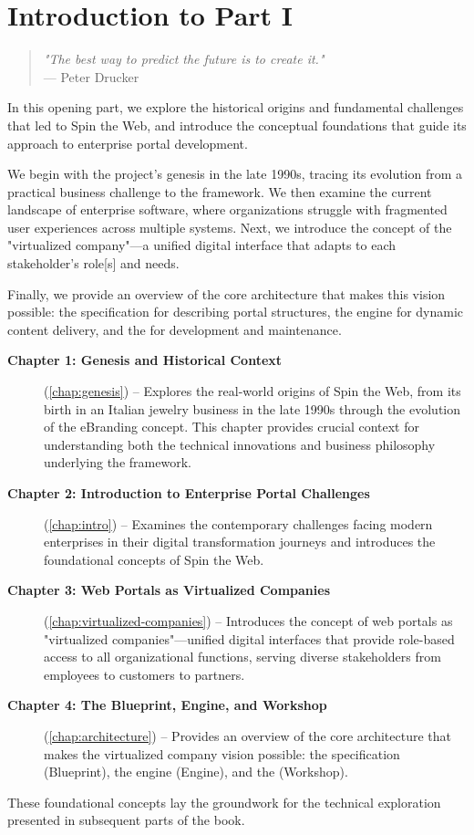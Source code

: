 
\chapter*{Introduction to Part I}
\label{part:foundations}

\begin{quote}
\textit{"The best way to predict the future is to create it."} \\
— Peter Drucker
\end{quote}

In this opening part, we explore the historical origins and fundamental challenges that led to Spin the Web, and introduce the conceptual foundations that guide its approach to enterprise portal development.

We begin with the project's genesis in the late 1990s, tracing its evolution from a practical business challenge to the framework. We then examine the current landscape of enterprise software, where organizations struggle with fragmented user experiences across multiple systems. Next, we introduce the concept of the "virtualized company"—a unified digital interface that adapts to each stakeholder's role[s] and needs.

Finally, we provide an overview of the core architecture that makes this vision possible: the \wbdl{} specification for describing portal structures, the \webspinner{} engine for dynamic content delivery, and the \studio{} for development and maintenance.

\begin{description}
\item[\textbf{Chapter 1: Genesis and Historical Context}] (\cref{chap:genesis}) -- Explores the real-world origins of Spin the Web, from its birth in an Italian jewelry business in the late 1990s through the evolution of the eBranding concept. This chapter provides crucial context for understanding both the technical innovations and business philosophy underlying the framework.

\item[\textbf{Chapter 2: Introduction to Enterprise Portal Challenges}] (\cref{chap:intro}) -- Examines the contemporary challenges facing modern enterprises in their digital transformation journeys and introduces the foundational concepts of Spin the Web.

\item[\textbf{Chapter 3: Web Portals as Virtualized Companies}] (\cref{chap:virtualized-companies}) -- Introduces the concept of web portals as "virtualized companies"—unified digital interfaces that provide role-based access to all organizational functions, serving diverse stakeholders from employees to customers to partners.

\item[\textbf{Chapter 4: The Blueprint, Engine, and Workshop}] (\cref{chap:architecture}) -- Provides an overview of the core architecture that makes the virtualized company vision possible: the \wbdl{} specification (Blueprint), the \webspinner{} engine (Engine), and the \studio{} (Workshop).
\end{description}

These foundational concepts lay the groundwork for the technical exploration presented in subsequent parts of the book.

